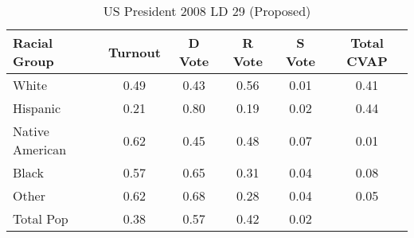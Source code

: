 \begin{table}[htb]
\begin{center}
\caption{US President 2008 LD 29 (Proposed)}
\label{pres08_cvap_ld_29}
\begin{tabular}{lccccc}
  \hline
Racial Group & Turnout & D Vote & R Vote & S Vote & Total CVAP \\ 
  \hline
White & 0.49 & 0.43 & 0.56 & 0.01 & 0.41 \\ 
  Hispanic & 0.21 & 0.80 & 0.19 & 0.02 & 0.44 \\ 
  Native American & 0.62 & 0.45 & 0.48 & 0.07 & 0.01 \\ 
  Black & 0.57 & 0.65 & 0.31 & 0.04 & 0.08 \\ 
  Other & 0.62 & 0.68 & 0.28 & 0.04 & 0.05 \\ 
  Total Pop & 0.38 & 0.57 & 0.42 & 0.02 &  \\ 
   \hline
\end{tabular}
\end{center}
\end{table}
